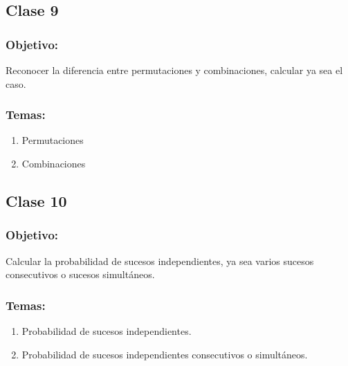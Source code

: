 \documentclass[12pt,letterpaper]{report}
\begin{document}
\subsection*{Clase 9}
\subsubsection*{Objetivo:}
Reconocer la diferencia entre permutaciones y combinaciones, calcular ya sea el caso.
\subsubsection*{Temas:}
\begin{enumerate}
    \item Permutaciones
    \item Combinaciones
\end{enumerate}
\subsection*{Clase 10}
\subsubsection*{Objetivo:}
Calcular la probabilidad de sucesos independientes, ya sea varios sucesos consecutivos o sucesos simultáneos.
\subsubsection*{Temas:}
\begin{enumerate}
    \item Probabilidad de sucesos independientes.
    \item Probabilidad de sucesos independientes consecutivos o simultáneos.
\end{enumerate}
\end{document}
